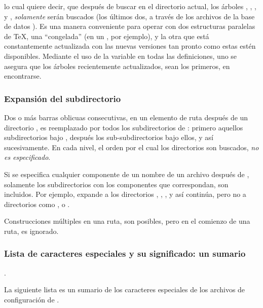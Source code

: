\documentclass{article}
\begin{document}
lo cual quiere decir, que después de buscar en el directorio
actual, los árboles ,
, , y
, \emph{solamente} serán buscados (los
últimos dos, a través de los archivos de la base de datos
). Es una manera conveniente para operar con dos
estructuras paralelas de \TeX{}, una ``congelada'' (en un \CD,
por ejemplo), y la otra que está constantemente actualizada
con las nuevas versiones tan pronto como estas estén disponibles.
Mediante el uso de la variable  en todas las
definiciones, uno se asegura que los árboles recientemente
actualizados, sean los primeros, en encontrarse. 

\subsubsection{Expansión del subdirectorio}
\label{sec:subdirectory-expnsion}

Dos o más barras oblicuas consecutivas, en un elemento de ruta después
de un directorio , es reemplazado por todos los subdirectorios
de : primero aquellos subdirectorios bajo , después los
sub-subdirectorios bajo ellos, y así sucesivamente. En cada nivel, el
orden por el cual los directorios son buscados, \emph{no es
especificado}.

Si se especifica cualquier componente de un nombre de un archivo
después de \samp{//}, solamente los subdirectorios con los componentes
que correspondan, son incluidos. Por ejemplo,  expande a
los directorios , , , y así
continúa, pero no a directorios como , o .

Construcciones múltiples \samp{//} en una ruta, son posibles, pero
\samp{//} en el comienzo de una ruta, es ignorado. 

\subsubsection{Lista de caracteres especiales y su significado: un
sumario}.

La siguiente lista es un sumario de los caracteres especiales de los
archivos de configuración de \KPS{}.
\end{document}
